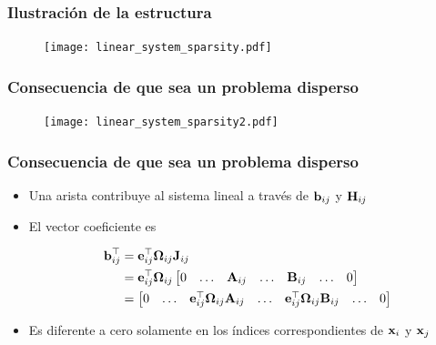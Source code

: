 \begin{frame}
	\frametitle{Ilustración de la estructura}
	
    \begin{figure}[!h]
		\texttt{[image: linear\_system\_sparsity.pdf]}
	\end{figure}
	
\end{frame}

\begin{frame}
	\frametitle{Consecuencia de que sea un problema disperso}
	
 	\begin{figure}[!h]
		\texttt{[image: linear\_system\_sparsity2.pdf]}
	\end{figure}
	
\end{frame}

\begin{frame}
	\frametitle{Consecuencia de que sea un problema disperso}
	
	\begin{itemize}
		\item Una arista contribuye al sistema lineal a través de $\boldsymbol{\mathbf{b}}_{ij}$ y $\boldsymbol{\mathbf{H}}_{ij}$
		\item El vector coeficiente es
		
		\begin{align*}
			\boldsymbol{\mathbf{b}}_{ij}^{\top} &= \boldsymbol{\mathbf{e}}_{ij}^{\top}\boldsymbol{\mathbf{\Omega}}_{ij}\boldsymbol{\mathbf{J}}_{ij}\\
			&= \boldsymbol{\mathbf{e}}_{ij}^{\top}\boldsymbol{\mathbf{\Omega}}_{ij}
				\begin{bmatrix}
					0 & \dots & \boldsymbol{\mathbf{A}}_{ij} & \dots & \boldsymbol{\mathbf{B}}_{ij} & \dots & 0
				\end{bmatrix}\\
			&= 
				\begin{bmatrix}
					0 & \dots & \boldsymbol{\mathbf{e}}_{ij}^{\top}\boldsymbol{\mathbf{\Omega}}_{ij}\boldsymbol{\mathbf{A}}_{ij} & \dots & \boldsymbol{\mathbf{e}}_{ij}^{\top}\boldsymbol{\mathbf{\Omega}}_{ij}\boldsymbol{\mathbf{B}}_{ij} & \dots & 0
				\end{bmatrix}
		\end{align*}
		\item Es diferente a cero solamente en los índices correspondientes de $\boldsymbol{\mathbf{x}}_{i}$ y $\boldsymbol{\mathbf{x}}_{j}$		
	\end{itemize}
	
\end{frame}

